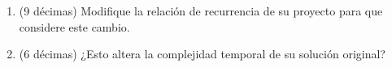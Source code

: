 
\begin{enumerate}
  \item (9 décimas) Modifique la relación de recurrencia de su proyecto para que considere este cambio.
  \item (6 décimas) ¿Esto altera la complejidad temporal de su solución original?
\end{enumerate}

\bigskip
